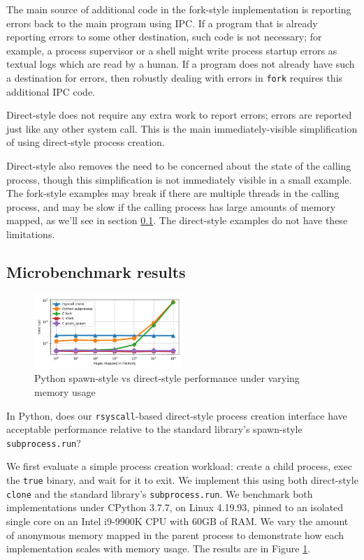 \documentclass[letterpaper,twocolumn,10pt]{article}
\begin{document}
The main source of additional code in the fork-style implementation
is reporting errors back to the main program using IPC.
If a program that is already reporting errors to some other destination,
such code is not necessary;
for example, a process supervisor or a shell might write process startup errors
as textual logs which are read by a human.
If a program does not already have such a destination for errors,
then robustly dealing with errors in \texttt{fork} requires this additional IPC code.

Direct-style does not require any extra work to report errors;
errors are reported just like any other system call.
This is the main immediately-visible simplification of using direct-style process creation.

Direct-style also removes the need to be concerned about the state of the calling process,
though this simplification is not immediately visible in a small example.
The fork-style examples may break if there are multiple threads in the calling process,
and may be slow if the calling process has large amounts of memory mapped, as we'll see in section \ref{subprocess_bench}.
The direct-style examples do not have these limitations.
\subsection{Microbenchmark results}\label{subprocess_bench}
\begin{figure}[h!]
\centering
 \includegraphics[width=0.5\textwidth]{subprocess_bench}
 \caption{Python spawn-style vs direct-style performance under varying memory usage}
 \label{fig:subprocess_bench}
\end{figure}
In Python, does our \texttt{rsyscall}-based direct-style process creation interface
have acceptable performance relative to the standard library's spawn-style \texttt{subprocess.run}?

We first evaluate a simple process creation workload:
create a child process, exec the \texttt{true} binary, and wait for it to exit.
We implement this using both direct-style \texttt{clone}
and the standard library's \texttt{subprocess.run}.
We benchmark both implementations under CPython 3.7.7, on Linux 4.19.93,
pinned to an isolated single core on an Intel i9-9900K CPU with 60GB of RAM.
We vary the amount of anonymous memory mapped in the parent process
to demonstrate how each implementation scales with memory usage.
The results are in Figure \ref{fig:subprocess_bench}.
\end{document}
